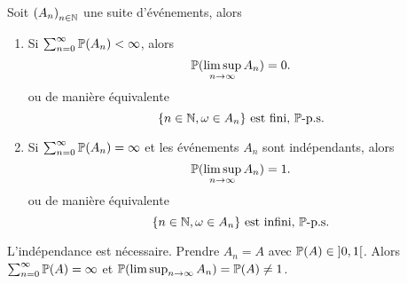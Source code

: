 \begin{proposition}
    Soit \({(A_n)}_{n\in\mathbb{N}}\) une suite d'événements, alors
    \begin{enumerate}
        \item Si \(\sum_{n=0}^\infty \mathbb{P}(A_n) < \infty\), alors
        \begin{equation*}
            \mathbb{P}(\limsup_{n\to\infty} A_n) = 0.
        \end{equation*}
        ou de manière équivalente
        \begin{equation*}
            \{n\in\mathbb{N},\omega\in A_n\} \text{ est fini, } \mathbb{P}\text{-p.s.}
        \end{equation*}

        \item Si \(\sum_{n=0}^\infty \mathbb{P}(A_n) = \infty\) et les événements \(A_n\) sont indépendants,
        alors
        \begin{equation*}
            \mathbb{P}(\limsup_{n\to\infty} A_n) = 1.
        \end{equation*}
        ou de manière équivalente
        \begin{equation*}
            \{n\in\mathbb{N},\omega\in A_n\} \text{ est infini, } \mathbb{P}\text{-p.s.}
        \end{equation*}
    \end{enumerate}

    \begin{remark}
        L'indépendance est nécessaire. Prendre \(A_n=A\) avec \(\mathbb{P}(A) \in \mathopen{}\left]0,1\right[\mathclose{}\).
        Alors \(\sum_{n=0}^\infty \mathbb{P}(A) = \infty\) et \(\mathbb{P}(\limsup_{n\to\infty} A_n) = \mathbb{P}(A) \neq 1\).
    \end{remark}
\end{proposition}


